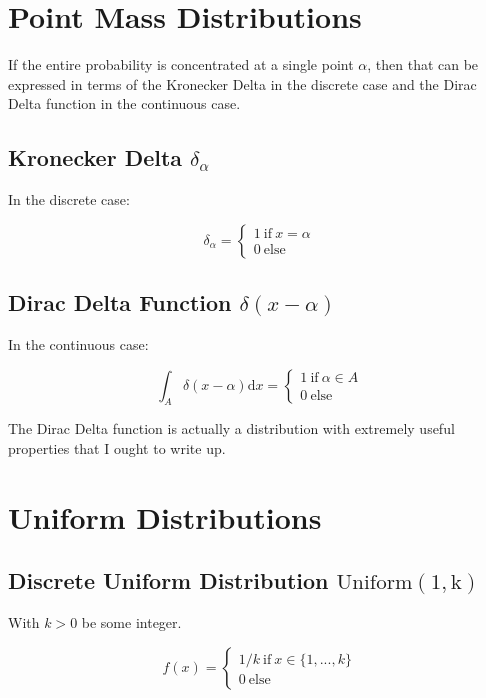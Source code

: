 \section{Point Mass Distributions}

If the entire probability is concentrated at a single point $\alpha$, then that can be expressed in terms of the Kronecker Delta in the discrete case and the Dirac Delta function in the continuous case.

\subsection{Kronecker Delta $\delta_{\alpha}$}
In the discrete case:

\begin{equation}
\delta_{\alpha} = \left\{\begin{array}{l} 1\mathrm{\ if\ }x = \alpha \\ 0\mathrm{\ else}\end{array} \right.
\end{equation}

\subsection{Dirac Delta Function $\delta(x-\alpha)$}
In the continuous case:

\begin{equation}
\int_A \delta(x-\alpha) \mathrm{d}x = \left\{\begin{array}{l} 1\mathrm{\ if\ }\alpha \in A \\ 0\mathrm{\ else}\end{array} \right.
\end{equation}

The Dirac Delta function is actually a distribution with extremely useful properties that I ought to write up. 

\section{Uniform Distributions}

\subsection{Discrete Uniform Distribution $\mathrm{Uniform(1,k)}$}
With $k>0$ be some integer.

\begin{equation}
f(x) = \left\{\begin{array}{l} 1/k \mathrm{\ if\ }x \in \{1,...,k\} \\ 0\mathrm{\ else}\end{array} \right.
\end{equation}

